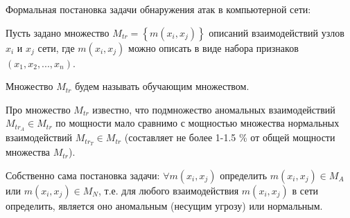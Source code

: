 Формальная постановка задачи обнаружения атак в компьютерной сети:

Пусть задано множество $M_{tr} = \left\{m(x_i, x_j)\right\}$ описаний взаимодействий узлов $x_i$ и $x_j$ сети, где $m(x_i, x_j)$ можно описать в виде набора признаков $(x_1, x_2, ..., x_n)$.


Множество $M_{tr}$ будем называть обучающим множеством.

Про множество $M_{tr}$ известно, что подмножество аномальных взаимодействий 
$M_{tr_A} \in M_{tr}$ по мощности мало сравнимо с мощностью множества 
нормальных взаимодействий $M_{tr_T} \in M_{tr}$ 
(составляет не более 1-1.5 \% от общей мощности множества $M_{tr}$). 


Собственно сама постановка задачи:
$\forall m(x_i, x_j)$ определить $m(x_i, x_j) \in M_A$ 
или $m(x_i, x_j) \in M_N$, т.е. для любого 
взаимодействия $m(x_i, x_j)$ в сети определить, 
является оно аномальным (несущим угрозу) или нормальным.